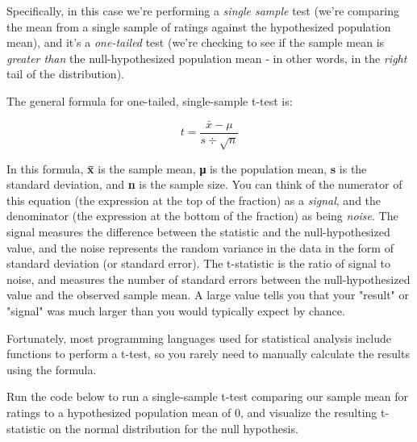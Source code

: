 \documentclass[11pt]{article}
\begin{document}
Specifically, in this case we're performing a \emph{single sample} test
(we're comparing the mean from a single sample of ratings against the
hypothesized population mean), and it's a \emph{one-tailed} test (we're
checking to see if the sample mean is \emph{greater than} the
null-hypothesized population mean - in other words, in the \emph{right}
tail of the distribution).

The general formula for one-tailed, single-sample t-test is:

\begin{equation}t = \frac{\bar{x} - \mu}{s \div \sqrt{n}} \end{equation}

In this formula, \textbf{x̄} is the sample mean, \textbf{μ} is the
population mean, \textbf{s} is the standard deviation, and \textbf{n} is
the sample size. You can think of the numerator of this equation (the
expression at the top of the fraction) as a \emph{signal}, and the
denominator (the expression at the bottom of the fraction) as being
\emph{noise}. The signal measures the difference between the statistic
and the null-hypothesized value, and the noise represents the random
variance in the data in the form of standard deviation (or standard
error). The t-statistic is the ratio of signal to noise, and measures
the number of standard errors between the null-hypothesized value and
the observed sample mean. A large value tells you that your "result" or
"signal" was much larger than you would typically expect by chance.

Fortunately, most programming languages used for statistical analysis
include functions to perform a t-test, so you rarely need to manually
calculate the results using the formula.

Run the code below to run a single-sample t-test comparing our sample
mean for ratings to a hypothesized population mean of 0, and visualize
the resulting t-statistic on the normal distribution for the null
hypothesis.
\end{document}
